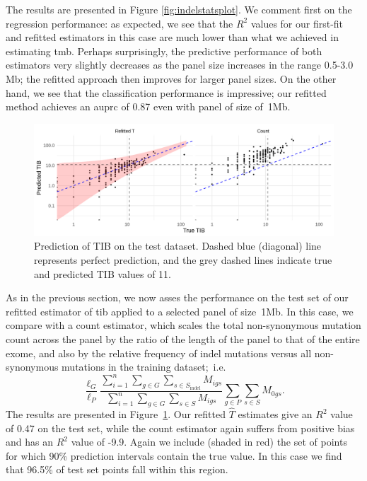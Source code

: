 \documentclass[12pt]{article}
\begin{document}
The results are presented in Figure \ref{fig:indelstatsplot}. We comment first on the regression performance: as expected, we see that the $R^2$ values for our first-fit and refitted estimators in this case are much lower than what we achieved in estimating \acrshort{tmb}. Perhaps surprisingly, the predictive performance of both estimators very slightly decreases as the panel size increases in the range 0.5-3.0 Mb; the refitted approach then improves for larger panel sizes. On the other hand, we see that the classification performance is impressive; our refitted method achieves an \acrshort{auprc} of 0.87 even with panel of size of~1Mb. 

\begin{figure}[htbp]
\centering
\includegraphics[width=6in]{fig10.png}
\vspace*{-5mm}
\caption{Prediction of TIB on the test dataset. Dashed blue (diagonal) line represents perfect prediction, and the grey dashed lines indicate true and predicted TIB values of 11. %
\label{fig:indel_predictions_figure}}
\vspace*{-2mm}
\end{figure} 

As in the previous section, we now asses the performance on the test set of our refitted estimator of \acrshort{tib} applied to a selected panel of size~1Mb.   %
In this case, we compare with a count estimator, which scales the total non-synonymous mutation count across the panel by the ratio of the length of the panel to that of the entire exome, and also by the relative frequency of indel mutations versus all non-synonymous mutations in the training dataset;~i.e. 
\[
\frac{\ell_G}{\ell_{P}} \frac{\sum_{i =1}^{n} \sum_{g \in G} \sum_{s \in S_{\text{indel}}} M_{igs}}{\sum_{i=1}^{n}\sum_{g \in G} \sum_{s \in S} M_{igs}}\sum_{g \in P} \sum_{s \in S} M_{0gs}.
\]
The results are presented in Figure~\ref{fig:indel_predictions_figure}. Our refitted $\hat{T}$ estimates give an $R^2$ value of 0.47 on the test set, while the count estimator again suffers from positive bias and has an $R^2$ value of -9.9. Again we include (shaded in red) the set of points for which 90\% prediction intervals contain the true value. In this case we find that 96.5\% of test set points fall within this region.
\end{document}
